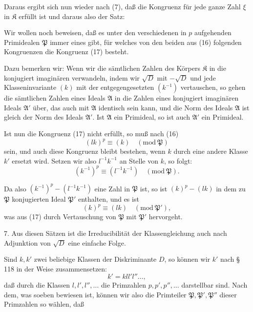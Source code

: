 Daraus ergibt sich nun wieder nach (7), daß die Kongruenz %
für jede ganze Zahl $\xi$ in $\mathfrak K$ erfüllt ist und daraus also der Satz:


Wir wollen noch beweisen, daß es unter den verschiedenen
in $p$ aufgehenden Primidealen $\mathfrak P$ immer eines gibt, für welches
von den beiden aus (16) folgenden Kongruenzen die Kongruenz
(17) besteht.

Dazu bemerken wir: Wenn wir die sämtlichen Zahlen des
Körpers $\mathfrak K$ in die konjugiert imaginären verwandeln, indem wir
$\sqrt{D}$ mit $-\sqrt{D}$ und jede Klasseninvariante $(k)$ mit der entgegengesetzten $(k^{-1})$ vertauschen, so gehen die sämtlichen Zahlen eines
Ideals $\mathfrak A$ in die Zahlen eines konjugiert imaginären Ideals $\mathfrak A'$
über, das auch mit $\mathfrak A$ identisch sein kann, und die Norm des
Ideals $\mathfrak A$ ist gleich der Norm des Ideals $\mathfrak A'$. Ist $\mathfrak A$ ein Primideal,
so ist auch $\mathfrak A'$ ein Primideal.

Ist nun die Kongruenz (17) nicht erfüllt, so muß nach (16)
\[
(lk)^p \equiv (k) \quad (\mathrm{mod}\ \mathfrak P)
\]
sein, und auch diese Kongruenz bleibt bestehen, wenn $k$ durch
eine andere Klasse $k'$ ersetzt wird. Setzen wir also $l^{-1}k^{-1}$ an
Stelle von $k$, so folgt:
\[
(k^{-1})^p \equiv (l^{-1}k^{-1}) \quad (\mathrm{mod}\ \mathfrak P).
\]

Da also $(k^{-1})^p - (l^{-1}k^{-1})$ eine Zahl in $\mathfrak P$ ist, so ist $(k)^p - (lk)$
in dem zu $\mathfrak P$ konjugierten Ideal $\mathfrak P'$ enthalten, und es ist
\[
(k)^p \equiv (lk) \quad (\mathrm{mod}\ \mathfrak P'),
\]
was aus (17) durch Vertauschung von $\mathfrak P$ mit $\mathfrak P'$ hervorgeht.

7. Aus diesen Sätzen ist die Irreducibilität der Klassengleichung auch nach Adjunktion von $\sqrt{D}$ eine einfache Folge.

Sind $k, k'$ zwei beliebige Klassen der Diskriminante $D$, so
können wir $k'$ nach § 118 in der Weise zusammensetzen:
\[
k' = k l l' l'' \ldots,
\]
daß durch die Klassen $l, l', l'', \ldots$ die Primzahlen $p, p', p'', \ldots$
darstellbar sind. Nach dem, was soeben bewiesen ist, können
wir also die Primteiler $\mathfrak P, \mathfrak P', \mathfrak P''$ dieser Primzahlen so wählen, daß
